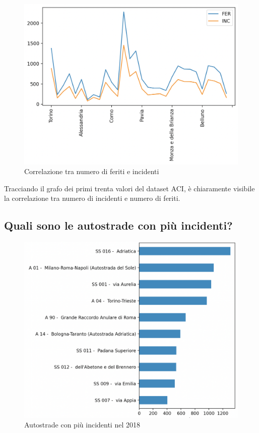 \documentclass[a4paper]{report}
\begin{document}
\begin{figure}
    \includegraphics[width=\linewidth]{../src/incidenti/incidenti_aci/comuni/corr_incidenti_feriti.png}
    \caption{Correlazione tra numero di feriti e incidenti}
    \label{fig:corr_incidenti_feriti}
\end{figure}

Tracciando il grafo dei primi trenta valori del dataset ACI, 
è chiaramente visibile la correlazione tra numero di incidenti e numero di feriti.



\subsection{Quali sono le autostrade con più incidenti?}
\begin{figure}
    \includegraphics[width=\linewidth]{../src/incidenti/incidenti_aci/autostrade/autostrade.png}
    \caption{Autostrade con più incidenti nel 2018}
    \label{fig:incidenti_autostrade}
\end{figure}
\end{document}
